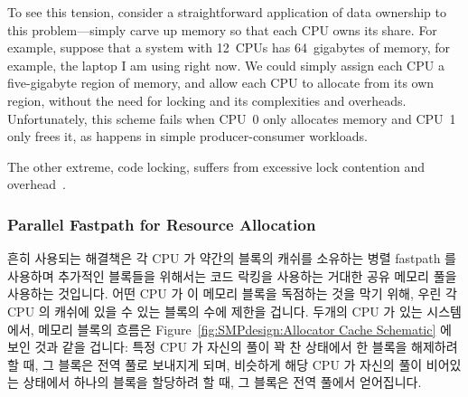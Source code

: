 To see this tension, consider a straightforward application of
data ownership to this problem---simply carve up memory so that
each CPU owns its share.
For example, suppose that a system with 12~CPUs has 64~gigabytes
of memory, for example, the laptop I am using right now.
We could simply assign each CPU a five-gigabyte region of memory,
and allow each CPU to allocate from its own region, without the need
for locking and its complexities and overheads.
Unfortunately, this scheme fails when CPU~0 only allocates memory and
CPU~1 only frees it, as happens in simple producer-consumer workloads.

The other extreme, code locking, suffers from excessive lock contention
and overhead~\cite{McKenney93}.

\fi

\subsubsection{Parallel Fastpath for Resource Allocation}
\label{sec:SMPdesign:Parallel Fastpath for Resource Allocation}

흔히 사용되는 해결책은 각 CPU 가 약간의 블록의 캐쉬를 소유하는 병렬 fastpath 를
사용하며 추가적인 블록들을 위해서는 코드 락킹을 사용하는 거대한 공유 메모리
풀을 사용하는 것입니다.
어떤 CPU 가 이 메모리 블록을 독점하는 것을 막기 위해, 우린 각 CPU 의 캐쉬에
있을 수 있는 블록의 수에 제한을 겁니다.
두개의 CPU 가 있는 시스템에서, 메모리 블록의 흐름은
Figure~\ref{fig:SMPdesign:Allocator Cache Schematic} 에 보인 것과 같을 겁니다:
특정 CPU 가 자신의 풀이 꽉 찬 상태에서 한 블록을 해제하려 할 때, 그 블록은 전역
풀로 보내지게 되며, 비슷하게 해당 CPU 가 자신의 풀이 비어있는 상태에서 하나의
블록을 할당하려 할 때, 그 블록은 전역 풀에서 얻어집니다.

